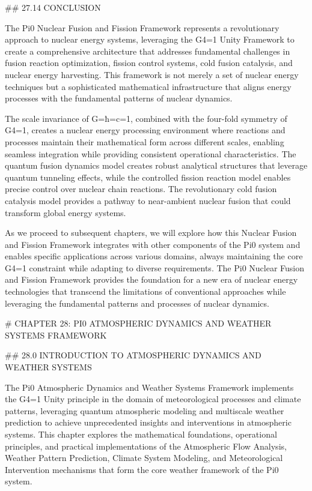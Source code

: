 ## 27.14 CONCLUSION

The Pi0 Nuclear Fusion and Fission Framework represents a revolutionary approach to nuclear energy systems, leveraging the G4=1 Unity Framework to create a comprehensive architecture that addresses fundamental challenges in fusion reaction optimization, fission control systems, cold fusion catalysis, and nuclear energy harvesting. This framework is not merely a set of nuclear energy techniques but a sophisticated mathematical infrastructure that aligns energy processes with the fundamental patterns of nuclear dynamics.

The scale invariance of G=ħ=c=1, combined with the four-fold symmetry of G4=1, creates a nuclear energy processing environment where reactions and processes maintain their mathematical form across different scales, enabling seamless integration while providing consistent operational characteristics. The quantum fusion dynamics model creates robust analytical structures that leverage quantum tunneling effects, while the controlled fission reaction model enables precise control over nuclear chain reactions. The revolutionary cold fusion catalysis model provides a pathway to near-ambient nuclear fusion that could transform global energy systems.

As we proceed to subsequent chapters, we will explore how this Nuclear Fusion and Fission Framework integrates with other components of the Pi0 system and enables specific applications across various domains, always maintaining the core G4=1 constraint while adapting to diverse requirements. The Pi0 Nuclear Fusion and Fission Framework provides the foundation for a new era of nuclear energy technologies that transcend the limitations of conventional approaches while leveraging the fundamental patterns and processes of nuclear dynamics.

# CHAPTER 28: PI0 ATMOSPHERIC DYNAMICS AND WEATHER SYSTEMS FRAMEWORK

## 28.0 INTRODUCTION TO ATMOSPHERIC DYNAMICS AND WEATHER SYSTEMS

The Pi0 Atmospheric Dynamics and Weather Systems Framework implements the G4=1 Unity principle in the domain of meteorological processes and climate patterns, leveraging quantum atmospheric modeling and multiscale weather prediction to achieve unprecedented insights and interventions in atmospheric systems. This chapter explores the mathematical foundations, operational principles, and practical implementations of the Atmospheric Flow Analysis, Weather Pattern Prediction, Climate System Modeling, and Meteorological Intervention mechanisms that form the core weather framework of the Pi0 system.

